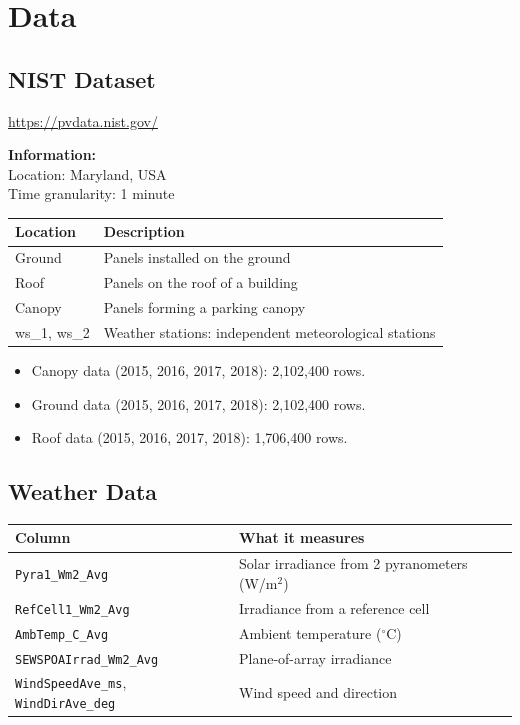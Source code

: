 \documentclass[11pt,a4paper]{article}
\begin{document}
\section{Data}

\subsection*{NIST Dataset}
\url{https://pvdata.nist.gov/}

\noindent\textbf{Information:}\\
Location: Maryland, USA\\
Time granularity: 1 minute

\medskip
\noindent\begin{tabularx}{\textwidth}{@{}lY@{}}
\hline
\textbf{Location} & \textbf{Description} \\
\hline
Ground & Panels installed on the ground \\
Roof & Panels on the roof of a building \\
Canopy & Panels forming a parking canopy \\
ws\_1, ws\_2 & Weather stations: independent meteorological stations \\
\hline
\end{tabularx}

\begin{itemize}
    \item Canopy data (2015, 2016, 2017, 2018): 2,102,400 rows.
    \item Ground data (2015, 2016, 2017, 2018): 2,102,400 rows.
    \item Roof data (2015, 2016, 2017, 2018): 1,706,400 rows.
\end{itemize}

\subsection*{Weather Data}
\begin{tabularx}{\textwidth}{@{}p{}Y@{}}
\hline
\textbf{Column} & \textbf{What it measures} \\
\hline
\texttt{Pyra1\_Wm2\_Avg} & Solar irradiance from 2 pyranometers (W/m$^2$) \\
\texttt{RefCell1\_Wm2\_Avg} & Irradiance from a reference cell \\
\texttt{AmbTemp\_C\_Avg} & Ambient temperature ($^\circ$C) \\
\texttt{SEWSPOAIrrad\_Wm2\_Avg} & Plane-of-array irradiance \\
\texttt{WindSpeedAve\_ms}, \texttt{WindDirAve\_deg} & Wind speed and direction \\
\hline
\end{tabularx}
\end{document}
